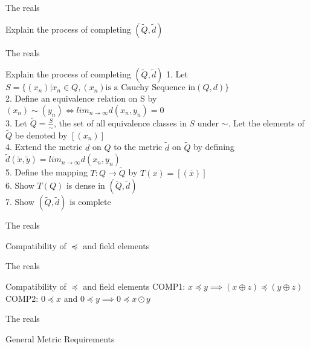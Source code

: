 \documentclass{beamer}
\begin{document}
\begin{frame}{The reals}
	\begin{block}{Explain the process of completing $(\widetilde{Q},\widetilde{d})$}
	\end{block}
\end{frame}

\begin{frame}{The reals}
	\begin{block}{Explain the process of completing $(\widetilde{Q},\widetilde{d})$}
		1. Let $S = \{(x_n)|x_n \in Q, (x_n) \text{is a Cauchy Sequence in} (Q,d)\}$\\
		2. Define an equivalence relation on S by $(x_n) \sim (y_n) \iff lim_{n \rightarrow \infty} d(x_n,y_n) =0$\\
		3. Let $\widetilde{Q} = \frac{S}{\sim}$, the set of all equivalence classes in $S$ under $\sim$. Let the elements of $\widetilde{Q}$ be denoted by $[(x_n)]$\\
		4. Extend the metric $d$ on $Q$ to the metric $\widetilde{d}$ on $\widetilde{Q}$ by defining $\widetilde{d}(\widetilde{x},\widetilde{y}) = lim_{n \rightarrow \infty} d(x_n,y_n)$\\
		5. Define the mapping $T: Q \rightarrow \widetilde{Q}$ by $T(x) = [(\bar{x})]$\\
		6. Show $T(Q)$ is dense in $(\widetilde{Q},\widetilde{d})$\\
		7. Show $(\widetilde{Q},\widetilde{d})$ is complete
        \end{block}
\end{frame}

\begin{frame}{The reals}
        \begin{block}{Compatibility of $\preceq$ and field elements}
        \end{block}
\end{frame}

\begin{frame}{The reals}
        \begin{block}{Compatibility of $\preceq$ and field elements}
		COMP1: $x \preceq y \implies (x \oplus z) \preceq (y \oplus z)$\\
		COMP2: $0 \preceq x$ and $0 \preceq y \implies 0 \preceq x \odot y$
	\end{block}
\end{frame}

\begin{frame}{The reals}
        \begin{block}{General Metric Requirements}
	\end{block}
\end{frame}
\end{document}
